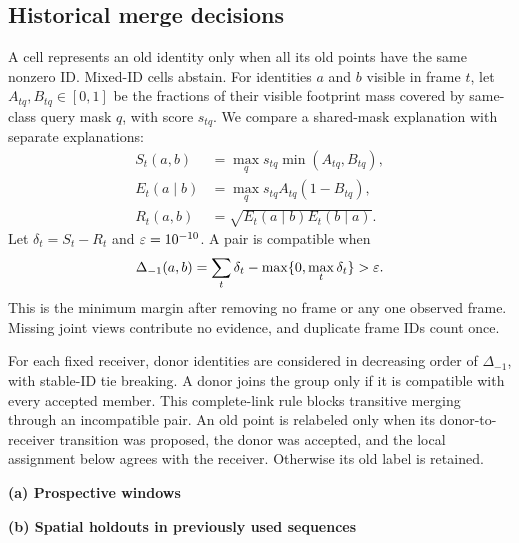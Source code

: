 \subsection{Historical merge decisions}
A cell represents an old identity only when all its old points have the same nonzero ID. Mixed-ID cells abstain. For identities $a$ and $b$ visible in frame $t$, let $A_{tq},B_{tq}\in[0,1]$ be the fractions of their visible footprint mass covered by same-class query mask $q$, with score $s_{tq}$. We compare a shared-mask explanation with separate explanations:
\begin{align}
S_t(a,b)&=\max_q s_{tq}\min(A_{tq},B_{tq}),\\
E_t(a\mid b)&=\max_q s_{tq}A_{tq}(1-B_{tq}),\\
R_t(a,b)&=\sqrt{E_t(a\mid b)E_t(b\mid a)}.
\end{align}
Let $\delta_t=S_t-R_t$ and $\varepsilon=10^{-10}$. A pair is compatible when
\begin{equation}
\Delta_{-1}(a,b)=\sum_t\delta_t-\max\{0,\max_t\delta_t\}>\varepsilon.
\label{eq:margin}
\end{equation}
This is the minimum margin after removing no frame or any one observed frame. Missing joint views contribute no evidence, and duplicate frame IDs count once.

For each fixed receiver, donor identities are considered in decreasing order of $\Delta_{-1}$, with stable-ID tie breaking. A donor joins the group only if it is compatible with every accepted member. This complete-link rule blocks transitive merging through an incompatible pair. An old point is relabeled only when its donor-to-receiver transition was proposed, the donor was accepted, and the local assignment below agrees with the receiver. Otherwise its old label is retained.

\begin{table}[t]
\centering
\begin{minipage}[t]{.43\textwidth}\vspace{0pt}\centering\small
\textbf{(a) Prospective windows}\par\smallskip

\end{minipage}\hfill
\begin{minipage}[t]{.55\textwidth}\vspace{0pt}\centering\small
\textbf{(b) Spatial holdouts in previously used sequences}\par\smallskip

\end{minipage}
\caption{Instance AP50:90. The method is fixed across windows. Each mean averages the windows in its own group; missing classes are excluded from a window's class mean. MaskClustering in (b) uses a shared-source core adaptation (Appendix~\ref{app:external}). The nearest-seed control changes only new-point assignment; historical decisions remain those of Ours.}
\label{tab:results}
\end{table}

